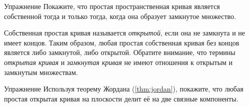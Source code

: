 \begin{thm}{Упражнение}\label{ex:proper-closed}
Покажите, что простая пространственная кривая является собственной тогда и только тогда, когда она образует замкнутое множество.
\end{thm}

Собственная простая кривая называется \emph{открытой}, если она не замкнута и не имеет концов.
Таким образом, любая простая собственная кривая без концов является либо замкнутой, либо открытой.
Обратите внимание, что термины \textit{открытая кривая} и \textit{замкнутая кривая} не имеют отношения к открытым и замкнутым множествам.

\begin{thm}{Упражнение}\label{ex:proper-curve}
Используя теорему Жордана (\ref{thm:jordan}), покажите, что любая простая открытая кривая на плоскости делит её на две связные компоненты.
\end{thm}
